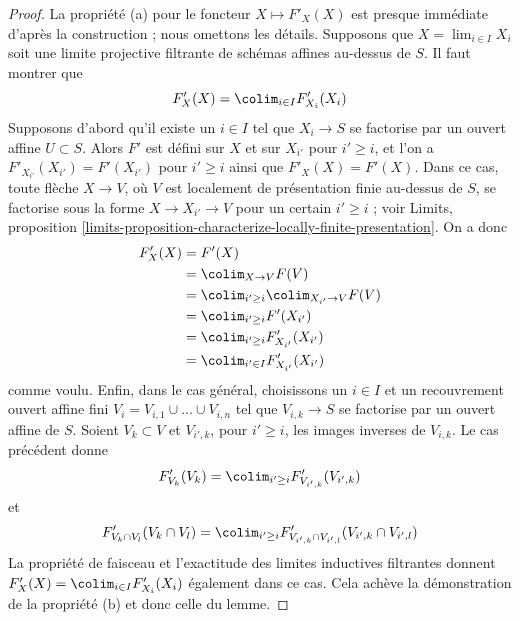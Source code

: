 \begin{proof}
\medskip\noindent
La propriété (a) pour le foncteur $X \mapsto F'_X(X)$ est presque immédiate
d'après la construction ; nous omettons les détails.
Supposons que $X = \lim_{i \in I} X_i$
soit une limite projective filtrante de schémas affines au-dessus de $S$. Il faut montrer que
$$
F'_X(X) = \colim_{i \in I} F'_{X_i}(X_i)
$$
Supposons d'abord qu'il existe un $i \in I$ tel que
$X_i \to S$ se factorise par un ouvert affine $U \subset S$.
Alors $F'$ est défini sur $X$ et sur $X_{i'}$ pour $i' \geq i$,
et l'on a $F'_{X_{i'}}(X_{i'}) = F'(X_{i'})$ pour
$i' \geq i$ ainsi que $F'_X(X) = F'(X)$. Dans ce cas, toute flèche
$X \to V$, où $V$ est localement de présentation finie
au-dessus de $S$, se factorise sous la forme $X \to X_{i'} \to V$ pour un certain
$i' \geq i$ ; voir Limits, proposition
\ref{limits-proposition-characterize-locally-finite-presentation}.
On a donc
\begin{align*}
F'_X(X)
& =
F'(X)  \\
& = \colim_{X \to V} F(V) \\
& =
\colim_{i' \geq i} \colim_{X_{i'} \to V} F(V) \\
& =
\colim_{i' \geq i} F'(X_{i'}) \\
& =
\colim_{i' \geq i} F'_{X_{i'}}(X_{i'}) \\
& =
\colim_{i' \in I} F'_{X_{i'}}(X_{i'})
\end{align*}
comme voulu. Enfin, dans le cas général, choisissons un $i \in I$ et un
recouvrement ouvert affine fini $V_i = V_{i, 1} \cup \ldots \cup V_{i, n}$
tel que $V_{i, k} \to S$ se factorise par un ouvert affine de $S$.
Soient $V_k \subset V$ et $V_{i', k}$, pour $i' \geq i$,
les images inverses de $V_{i, k}$.
Le cas précédent donne
$$
F'_{V_k}(V_k) = \colim_{i' \geq i} F'_{V_{i', k}}(V_{i', k})
$$
et
$$
F'_{V_k \cap V_l}(V_k \cap V_l) =
\colim_{i' \geq i}
F'_{V_{i', k} \cap V_{i', l}}(V_{i', k} \cap V_{i', l})
$$
La propriété de faisceau et l'exactitude des limites inductives filtrantes
donnent $F'_X(X) = \colim_{i \in I} F'_{X_i}(X_i)$
également dans ce cas. Cela achève la démonstration de la propriété (b)
et donc celle du lemme.
\end{proof}

